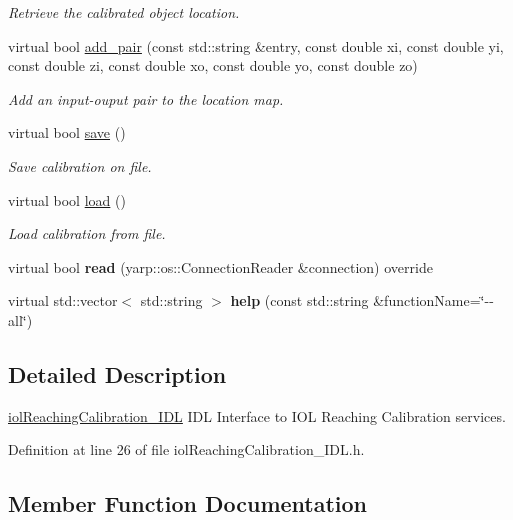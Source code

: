 \begin{DoxyCompactItemize}
\begin{DoxyCompactList}\small\item\em Retrieve the calibrated object location. \end{DoxyCompactList}\item 
virtual bool \mbox{\hyperlink{classiolReachingCalibration__IDL_a90138cbd2399f41442eca3a525f8108a}{add\+\_\+pair}} (const std\+::string \&entry, const double xi, const double yi, const double zi, const double xo, const double yo, const double zo)
\begin{DoxyCompactList}\small\item\em Add an input-\/ouput pair to the location map. \end{DoxyCompactList}\item 
virtual bool \mbox{\hyperlink{classiolReachingCalibration__IDL_a4ec6cb2da2cb5a4a9edb5111c2741eae}{save}} ()
\begin{DoxyCompactList}\small\item\em Save calibration on file. \end{DoxyCompactList}\item 
virtual bool \mbox{\hyperlink{classiolReachingCalibration__IDL_a894a864a8455f9ffc8da294c7a8bde98}{load}} ()
\begin{DoxyCompactList}\small\item\em Load calibration from file. \end{DoxyCompactList}\item 
\mbox{\label{classiolReachingCalibration__IDL_acf84f52fd963fd16b4faa721b05b710a}} 
virtual bool {\bfseries read} (yarp\+::os\+::\+Connection\+Reader \&connection) override
\item 
\mbox{\label{classiolReachingCalibration__IDL_a138bf2b981da32b8019b4a772c8a6409}} 
virtual std\+::vector$<$ std\+::string $>$ {\bfseries help} (const std\+::string \&function\+Name=\char`\"{}-\/-\/all\char`\"{})
\end{DoxyCompactItemize}


\subsection{Detailed Description}
\mbox{\hyperlink{classiolReachingCalibration__IDL}{iol\+Reaching\+Calibration\+\_\+\+I\+DL}} I\+DL Interface to I\+OL Reaching Calibration services. 

Definition at line 26 of file iol\+Reaching\+Calibration\+\_\+\+I\+D\+L.\+h.



\subsection{Member Function Documentation}
\mbox{\label{classiolReachingCalibration__IDL_a90138cbd2399f41442eca3a525f8108a}} 
